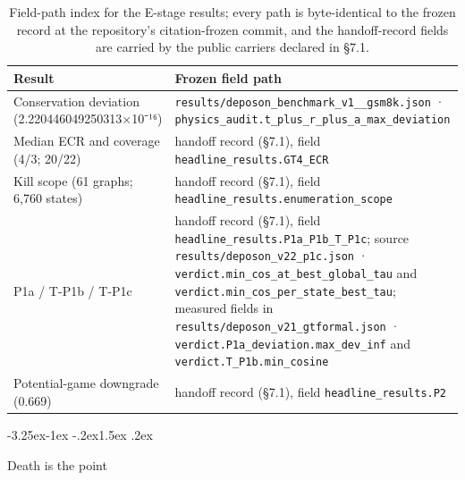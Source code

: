 \documentclass[11pt,a4paper]{article}
\makeatletter
\renewcommand\subsection{\@startsection{subsection}{2}{\z@}%
  {-3.25ex\@plus -1ex \@minus -.2ex}{1.5ex \@plus .2ex}%
  {\normalfont\large\bfseries\raggedright}}
\makeatother
\begin{document}
\begin{table}[htbp]
\centering
\small
\setlength{\tabcolsep}{4pt}
\renewcommand{\arraystretch}{1.15}
\begin{tabularx}{0.985\textwidth}{@{}>{\raggedright\arraybackslash}p{}>{\raggedright\arraybackslash}X@{}}
\toprule
\textbf{Result} & \textbf{Frozen field path} \\
\midrule
Conservation deviation (2.220446049250313\allowbreak ×10⁻¹⁶) & \texttt{results/\allowbreak deposon\_\allowbreak benchmark\_\allowbreak v1\_\allowbreak 4\_\allowbreak gsm8k.json} · \texttt{physics\_\allowbreak audit.t\_\allowbreak plus\_\allowbreak r\_\allowbreak plus\_\allowbreak a\_\allowbreak max\_\allowbreak deviation} \\
Median ECR and coverage (4/3; 20/22) & handoff record (§7.1), field \texttt{headline\_\allowbreak results.GT4\_\allowbreak ECR} \\
Kill scope (61 graphs; 6,760 states) & handoff record (§7.1), field \texttt{headline\_\allowbreak results.enumeration\_\allowbreak scope} \\
P1a / T-P1b / T-P1c & handoff record (§7.1), field \texttt{headline\_\allowbreak results.P1a\_\allowbreak P1b\_\allowbreak T\_\allowbreak P1c}; source \texttt{results/\allowbreak deposon\_\allowbreak v22\_\allowbreak p1c.json} · \texttt{verdict.min\_\allowbreak cos\_\allowbreak at\_\allowbreak best\_\allowbreak global\_\allowbreak tau} and \texttt{verdict.min\_\allowbreak cos\_\allowbreak per\_\allowbreak state\_\allowbreak best\_\allowbreak tau}; measured fields in \texttt{results/\allowbreak deposon\_\allowbreak v21\_\allowbreak gtformal.json} · \texttt{verdict.P1a\_\allowbreak deviation.max\_\allowbreak dev\_\allowbreak inf} and \texttt{verdict.T\_\allowbreak P1b.min\_\allowbreak cosine} \\
Potential-game downgrade (0.669) & handoff record (§7.1), field \texttt{headline\_\allowbreak results.P2} \\
\bottomrule
\end{tabularx}
\caption{Field-path index for the E-stage results; every path is byte-identical to the frozen record at the repository's citation-frozen commit, and the handoff-record fields are carried by the public carriers declared in §7.1.}
\label{tab:fieldpathsE}
\end{table}

\subsection{Death is the point}
\end{document}
